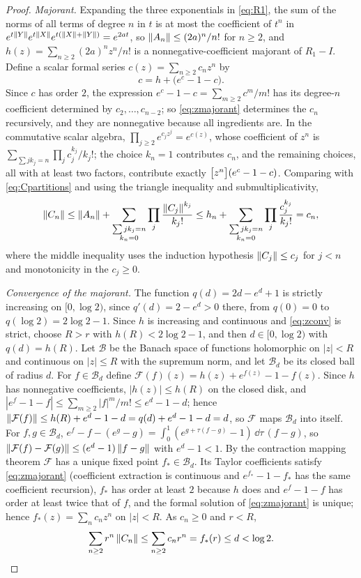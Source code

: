 \begin{proof}
\emph{Majorant.} Expanding the three exponentials in \eqref{eq:R1}, the
sum of the norms of all terms of degree $n$ in $t$ is at most the
coefficient of $t^n$ in $e^{t\left\lVert Y\right\rVert}e^{t\left\lVert X\right\rVert}e^{t(\left\lVert X\right\rVert+\left\lVert Y\right\rVert)}
=e^{2at}$, so $\left\lVert A_n\right\rVert\leq(2a)^n/n!$ for $n\geq2$, and
$h(z)=\sum_{n\geq2}(2a)^nz^n/n!$ is a nonnegative-coefficient majorant of
$R_1-I$. Define a scalar formal series $c(z)=\sum_{n\geq2}c_nz^n$ by
\begin{equation}\label{eq:zmajorant}
 c=h+\bigl(e^{c}-1-c\bigr).
\end{equation}
Since $c$ has order $2$, the expression $e^c-1-c=\sum_{m\geq2}c^m/m!$ has
its degree-$n$ coefficient determined by $c_2,\ldots,c_{n-2}$; so
\eqref{eq:zmajorant} determines the $c_n$ recursively, and they are
nonnegative because all ingredients are. In the commutative scalar algebra,
$\prod_{j\geq2}e^{c_jz^j}=e^{c(z)}$, whose coefficient of $z^n$ is
$\sum_{\sum jk_j=n}\prod_jc_j^{k_j}/k_j!$; the choice $k_n=1$ contributes
$c_n$, and the remaining choices, all with at least two factors, contribute
exactly $\bigl[z^n\bigr](e^c-1-c)$. Comparing with \eqref{eq:Cpartitions} and
using the triangle inequality and submultiplicativity,
\[
 \left\lVert C_n\right\rVert\leq\left\lVert A_n\right\rVert+\sum_{\substack{\sum jk_j=n\\k_n=0}}
 \prod_j\frac{\left\lVert C_j\right\rVert^{k_j}}{k_j!}
 \leq h_n+\sum_{\substack{\sum jk_j=n\\k_n=0}}\prod_j\frac{c_j^{k_j}}{k_j!}=c_n,
\]
where the middle inequality uses the induction hypothesis
$\left\lVert C_j\right\rVert\leq c_j$ for $j<n$ and monotonicity in the $c_j\geq0$.

\emph{Convergence of the majorant.} The function $q(d)=2d-e^d+1$ is
strictly increasing on $[0,\log2)$, since $q'(d)=2-e^d>0$ there, from
$q(0)=0$ to $q(\log2)=2\log2-1$. Since $h$ is increasing and continuous and
\eqref{eq:zconv} is strict, choose $R>r$ with $h(R)<2\log2-1$, and then
$d\in[0,\log2)$ with $q(d)=h(R)$. Let $\mathcal B$ be the Banach space of
functions holomorphic on $|z|<R$ and continuous on $|z|\leq R$ with the
supremum norm, and let $\mathcal B_d$ be its closed ball of radius $d$.
For $f\in\mathcal B_d$ define $\mathcal F(f)(z)=h(z)+e^{f(z)}-1-f(z)$.
Since $h$ has nonnegative coefficients, $|h(z)|\leq h(R)$ on the closed
disk, and $|e^{f}-1-f|\leq\sum_{m\geq2}|f|^m/m!\leq e^d-1-d$; hence
$\left\lVert\mathcal F(f)\right\rVert\leq h(R)+e^d-1-d=q(d)+e^d-1-d=d$, so $\mathcal F$
maps $\mathcal B_d$ into itself. For $f,g\in\mathcal B_d$,
$e^{f}-f-(e^{g}-g)=\int_0^1(e^{g+\tau(f-g)}-1)\,\dd\tau\,(f-g)$, so
$\left\lVert\mathcal F(f)-\mathcal F(g)\right\rVert\leq(e^d-1)\left\lVert f-g\right\rVert$ with
$e^d-1<1$. By the contraction mapping theorem $\mathcal F$ has a unique
fixed point $f_*\in\mathcal B_d$. Its Taylor coefficients satisfy
\eqref{eq:zmajorant} (coefficient extraction is continuous and
$e^{f_*}-1-f_*$ has the same coefficient recursion), $f_*$ has order at
least $2$ because $h$ does and $e^{f}-1-f$ has order at least twice that of
$f$, and the formal solution of \eqref{eq:zmajorant} is unique; hence
$f_*(z)=\sum_nc_nz^n$ on $|z|<R$. As $c_n\geq0$ and $r<R$,
\[
 \sum_{n\geq2}r^n\left\lVert C_n\right\rVert\leq\sum_{n\geq2}c_nr^n=f_*(r)\leq d<\log2.
\]


\end{proof}
